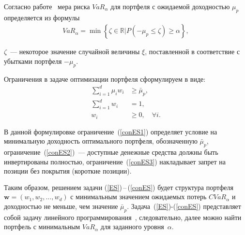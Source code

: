 Согласно работе~\cite{Rock2000} мера риска $\textit{VaR}_\alpha$ для портфеля с ожидаемой доходностью $\mu_p$ определяется из формулы
\begin{gather*} \label{VaR}
    \textit{VaR}_\alpha = \min\left\{\zeta \in \mathbb{R}|P(-\mu_p \le \zeta) \ge \alpha \right\},
\end{gather*}
\begin{where}
    \item $\zeta$~--- некоторое значение случайной величины $\xi$, поставленной в соответствие с убытками портфеля $-\mu_p$.
\end{where}


Ограничения в задаче оптимизации портфеля сформулируем в виде:
\begin{subequations}\label{conES}
\begin{align}
\sum_{i=1}^d \mu_i w_i &\ge \bar{\mu}_p, \label{conES1}\\
\sum_{i=1}^d w_i &= 1, \label{conES2} \\
w_i &\ge 0, \quad \forall i. \label{conES3}
\end{align}
\end{subequations}

В данной формулировке ограничение~(\ref{conES1}) определяет условие на минимальную доходность оптимального портфеля, обозначенную $\bar{\mu}_p$, ограничение~(\ref{conES2})~--- доступные денежные средства должны быть инвертированы полностью, ограничение~(\ref{conES3}) накладывает запрет на позиции без покрытия (короткие позиции).

Таким образом, решением задачи (\ref{ES})\,--\,(\ref{conES}) будет структура портфеля $\textbf{w}=(w_1, w_2, \ldots, w_d)$ с минимальным значением ожидаемых потерь $CVaR_\alpha$ и доходностью не меньше, чем значение $\bar{\mu}_p$.
Задача~(\ref{ES})-(\ref{conES}) представляет собой задачу линейного программирования~\cite{Rock2000}, следовательно,  далее можно найти портфель с минимальным $\textit{VaR}_\alpha$ для заданного уровня~$\alpha$.



